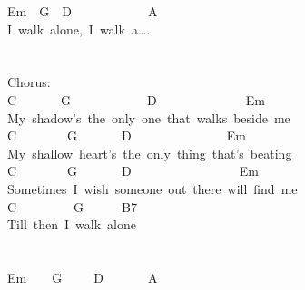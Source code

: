 \documentclass[]{book}
\begin{document}
Em~~G~~D~~~~~~~~~~~~A\\
\hspace*{0.333em}\hspace*{0.333em}\hspace*{0.333em}\hspace*{0.333em}\hspace*{0.333em}\hspace*{0.333em}\hspace*{0.333em}\hspace*{0.333em}\hspace*{0.333em}\hspace*{0.333em}\hspace*{0.333em}\hspace*{0.333em}I~walk~alone,~I~walk~a\ldots.\\
~\\
~\\
Chorus:\\
C~~~~~~~G~~~~~~~~~~~~D~~~~~~~~~~~~~~Em\\
\hspace*{0.333em}\hspace*{0.333em}\hspace*{0.333em}\hspace*{0.333em}My~shadow's~the~only~one~that~walks~beside~me\\
C~~~~~~~~G~~~~~~~D~~~~~~~~~~~~~~~Em\\
\hspace*{0.333em}\hspace*{0.333em}\hspace*{0.333em}\hspace*{0.333em}My~shallow~heart's~the~only~thing~that's~beating\\
C~~~~~~~~G~~~~~~~D~~~~~~~~~~~~~~~~~Em\\
\hspace*{0.333em}\hspace*{0.333em}\hspace*{0.333em}\hspace*{0.333em}Sometimes~I~wish~someone~out~there~will~find~me\\
C~~~~~~~~~G~~~~~~B7\\
\hspace*{0.333em}\hspace*{0.333em}\hspace*{0.333em}\hspace*{0.333em}Till~then~I~walk~alone\\
~\\
~\\
\hspace*{0.333em}Em~~~~G~~~~~D~~~~~~~A\\
\end{document}
